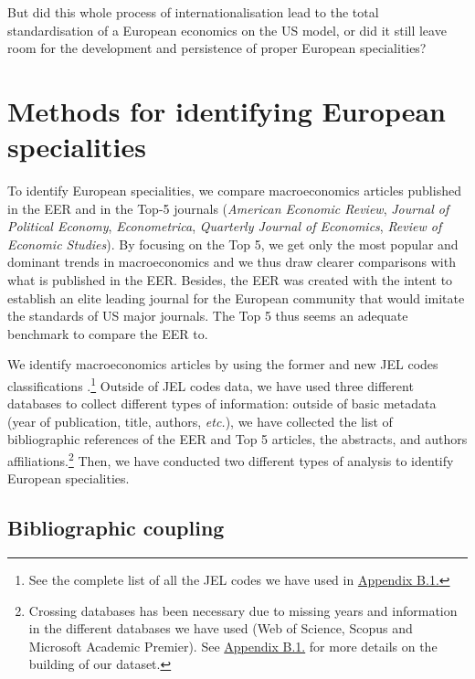 \documentclass[]{elsarticle} %
\begin{document}
But did this whole process of internationalisation lead to the total
standardisation of a European economics on the US model, or did it still
leave room for the development and persistence of proper European
specialities?

\hypertarget{methods}{%
\section{Methods for identifying European specialities}\label{methods}}

To identify European specialities, we compare macroeconomics articles
published in the EER and in the Top-5 journals (\emph{American Economic
Review}, \emph{Journal of Political Economy}, \emph{Econometrica},
\emph{Quarterly Journal of Economics}, \emph{Review of Economic
Studies}). By focusing on the Top 5, we get only the most popular and
dominant trends in macroeconomics and we thus draw clearer comparisons
with what is published in the EER. Besides, the EER was created with the
intent to establish an elite leading journal for the European community
that would imitate the standards of US major journals. The Top 5 thus
seems an adequate benchmark to compare the EER to.

We identify macroeconomics articles by using the former and new JEL
codes classifications \citep{jel1991}.\footnote{See the complete list of
  all the JEL codes we have used in
  \protect\hyperlink{eer-top5-macro}{Appendix B.1.}} Outside of JEL
codes data, we have used three different databases to collect different
types of information: outside of basic metadata (year of publication,
title, authors, \emph{etc.}), we have collected the list of
bibliographic references of the EER and Top 5 articles, the abstracts,
and authors affiliations.\footnote{Crossing databases has been necessary
  due to missing years and information in the different databases we
  have used (Web of Science, Scopus and Microsoft Academic Premier). See
  \protect\hyperlink{corpus}{Appendix B.1.} for more details on the
  building of our dataset.} Then, we have conducted two different types
of analysis to identify European specialities.

\hypertarget{bibliographic-coupling}{%
\subsection{Bibliographic coupling}\label{bibliographic-coupling}}
\end{document}
